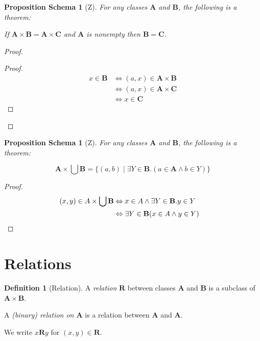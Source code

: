 \documentclass{book}
\let\qed\relax
\newtheorem{props}[ax]{Proposition Schema}
\theoremstyle{definition}
\newtheorem{df}[ax]{Definition}
\begin{document}
\begin{props}[Z]
For any classes $\mathbf{A}$ and $\mathbf{B}$, the following is a theorem:

If $\mathbf{A} \times \mathbf{B} = \mathbf{A} \times \mathbf{C}$ and $\mathbf{A}$ is nonempty then $\mathbf{B} = \mathbf{C}$.
\end{props}

\begin{proof}
\pf
{}
\begin{proof}
	\pf
	\begin{align*}
		x \in \mathbf{B} & \Leftrightarrow (a,x) \in \mathbf{A} \times \mathbf{B} \\
		& \Leftrightarrow (a,x) \in \mathbf{A} \times \mathbf{C} \\
		& \Leftrightarrow x \in \mathbf{C}
	\end{align*}
\end{proof}
\qed
\end{proof}

\begin{props}[Z]
For any classes $\mathbf{A}$ and $\mathbf{B}$, the following is a theorem:

\[ \mathbf{A} \times \bigcup \mathbf{B} = \{ (a,b) \mid \exists Y \in \mathbf{B}. (a \in \mathbf{A} \wedge b \in Y) \} \]
\end{props}

\begin{proof}
\pf
\begin{align*}
(x,y) \in A \times \bigcup \mathbf{B} & \Leftrightarrow x \in A \wedge \exists Y \in \mathbf{B}. y \in Y \\
& \Leftrightarrow \exists Y \in \mathbf{B} (x \in A \wedge y \in Y) & \qed
\end{align*}
\end{proof}

\section{Relations}

\begin{df}[Relation]
A \emph{relation} $\mathbf{R}$ between classes $\mathbf{A}$ and $\mathbf{B}$ is a subclass of $\mathbf{A} \times \mathbf{B}$.

A \emph{(binary) relation on $\mathbf{A}$} is a relation between $\mathbf{A}$ and $\mathbf{A}$.

We write $x \mathbf{R} y$ for $(x,y) \in \mathbf{R}$.
\end{df}
\end{document}

